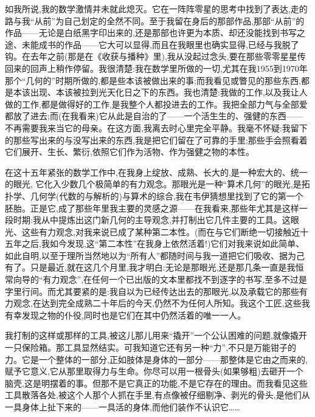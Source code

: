 如我所说,我的数学激情并未就此熄灭。它在一阵阵零星的思考中找到了表达,走的路与我“从前”为自己划定的全然不同。至于我留在身后的那部作品,那部“从前”的作品——无论是白纸黑字印出来的,还是那部也许更为本质、却还没能找到书写之途、未能成书的作品——它大可以显得,而且在我眼里也确实显得,已经与我脱了钩。在去年之前(那是在《收获与播种》里),我从没起过念头,要在那些零零星星传回来的回声上稍作停留。我很清楚:我在数学里所做的一切,尤其在我1955到1970年那个“几何的”时期所做的,都是些本该被做出来的事;而我看见或瞥见的那些东西,都是本该出现、本该被拉到光天化日之下的东西。我也清楚:我做的工作,以及我让人做的工作,都是做得好的工作,是我整个人都投进去的工作。我把全部力气与全部爱都放了进去;而(在我看来)它从此是自治的了——一个活生生的、强健的东西——不再需要我来当它的母亲。在这方面,我离去时心里完全平静。我毫不怀疑:我留下的那些写出来的与没写出来的东西,我是把它们留在了可靠的手里;那些手会照看着它们展开、生长、繁衍,依照它们作为活物、作为强健之物的本性。

在这十五年紧张的数学工作中,在我身上绽放、成熟、长大的,是一种宏大的、统一的眼光,
它化入少数几个极简单的有力观念。那眼光是一种“算术几何”的眼光,是拓扑学、几何学(代数的与解析的)与算术的综合,我在韦伊猜想里找到了它的第一个胚胎。正是它,成了那些年里我主要的灵感之源——在我看来,那些年尤其是这样一段时期:我从中提炼出这门新几何的主导观念,并打制出它几件主要的工具。这眼光、这些有力观念,对我来说已成了某种第二本性。(而在与它们断绝一切接触近十五年之后,我如今发现,这“第二本性”在我身上依然活着!)它们对我来说如此简单、如此自明,以至于理所当然地以为“所有人”都随时间与我一道把它们吸收、据为己有了。只是最近,就在这几个月里,我才明白:无论是那眼光,还是那几条一直是我恒常向导的“有力观念”,在任何一个已出版的文本里都找不到逐字的书写,至多不过是字里行间。而尤其要紧的是:我自以为已经传达出去的那眼光,以及承载它的那些有力观念,在达到完全成熟二十年后的今天,仍然不为任何人所知。我这个工匠,这些我有幸发现之物的仆役,同时也是它们在其中仍然活着的唯一一人。

我打制的这样或那样的工具,被这儿那儿用来“撬开”一个公认困难的问题,就像撬开一只保险箱。那工具显然结实。可我知道它还有另一种“力”,不只是万能钳子的力。它是一个整体的一部分,正如肢体是身体的一部分——那整体是它由之而来的,赋予它意义,它从那里取得力与生命。你尽可以用一根骨头(如果够粗)去砸开一个脑壳,这是明摆着的事。但那不是它真正的功能,不是它存在的理由。而我看见这些工具散落各处,被这个人那个人抓在手里,有点像被仔细剔净、剥光的骨头,是他们从一具身体上扯下来的——一具活的身体,而他们装作不认识它……

